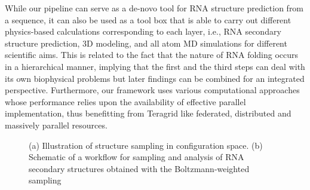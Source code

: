 \documentclass[a4paper,10pt]{article}
\newcommand{\up}{\vspace*{-1em}}
\begin{document}
While our pipeline can serve as a de-novo tool for RNA structure prediction from a sequence, it can also be used as a tool box that is able to carry out different physics-based calculations corresponding to each layer, i.e., RNA secondary structure prediction, 3D modeling, and all atom MD simulations for different scientific aims.  This is related to the fact that the nature of RNA folding occurs in a hierarchical manner, implying that the first and the third steps can deal with its own biophysical problems but later findings can be combined for an integrated perspective. Furthermore, our framework uses various computational approaches whose performance relies upon the availability of effective parallel implementation, thus benefitting from Teragrid like federated, distributed and massively parallel resources.

\begin{figure}
\begin{center}
\end{center}
\up\up
\caption{(a) Illustration of structure sampling in configuration space.  (b) Schematic of a workflow for sampling and analysis of RNA secondary structures obtained with the Boltzmann-weighted sampling}
\label{fig:folding energy landscape}
\end{figure}
\end{document}
